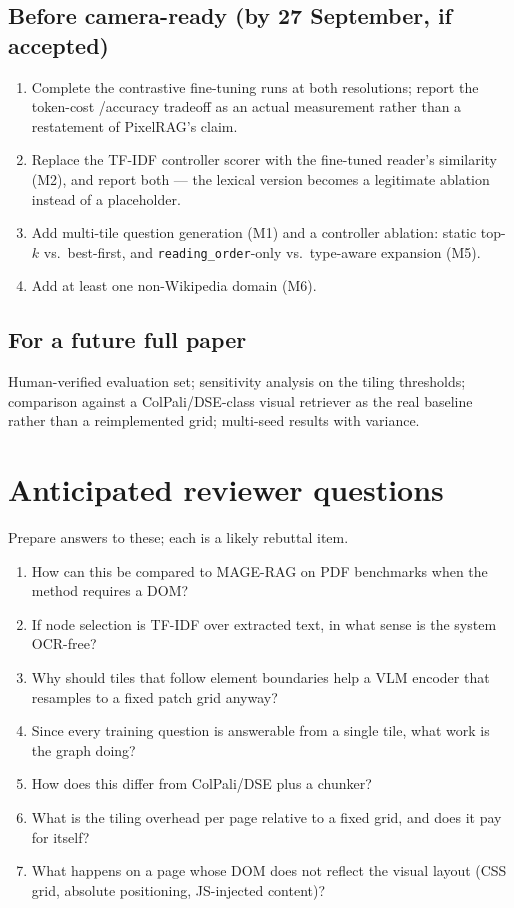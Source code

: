 \documentclass[11pt,a4paper]{article}
\begin{document}
\subsection*{Before camera-ready (by 27 September, if accepted)}
\begin{enumerate}
\item Complete the contrastive fine-tuning runs at both resolutions; report the token-cost
      /accuracy tradeoff as an actual measurement rather than a restatement of PixelRAG's claim.
\item Replace the TF-IDF controller scorer with the fine-tuned reader's similarity (M2), and
      report both --- the lexical version becomes a legitimate ablation instead of a placeholder.
\item Add multi-tile question generation (M1) and a controller ablation: static top-$k$ vs.\
      best-first, and \texttt{reading\_order}-only vs.\ type-aware expansion (M5).
\item Add at least one non-Wikipedia domain (M6).
\end{enumerate}

\subsection*{For a future full paper}
Human-verified evaluation set; sensitivity analysis on the tiling thresholds; comparison
against a ColPali/DSE-class visual retriever as the real baseline rather than a
reimplemented grid; multi-seed results with variance.

\section{Anticipated reviewer questions}

Prepare answers to these; each is a likely rebuttal item.
\begin{enumerate}
\item How can this be compared to MAGE-RAG on PDF benchmarks when the method requires a DOM?
\item If node selection is TF-IDF over extracted text, in what sense is the system OCR-free?
\item Why should tiles that follow element boundaries help a VLM encoder that resamples to a
      fixed patch grid anyway?
\item Since every training question is answerable from a single tile, what work is the graph doing?
\item How does this differ from ColPali/DSE plus a chunker?
\item What is the tiling overhead per page relative to a fixed grid, and does it pay for itself?
\item What happens on a page whose DOM does not reflect the visual layout (CSS grid, absolute
      positioning, JS-injected content)?
\end{enumerate}
\end{document}
